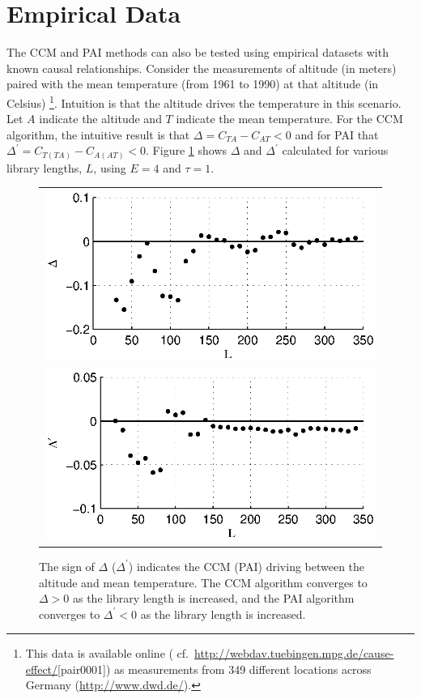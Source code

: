 \documentclass[twocolumn,aps,pre,groupedaddress]{revtex4-1}
\begin{document}
\section{Empirical Data}
The CCM and PAI methods can also be tested using empirical datasets with known causal relationships.  Consider the measurements of altitude (in meters) paired with the mean temperature (from 1961 to 1990) at that altitude (in Celsius) \footnote{This data is available online (\cite{bache2013} cf.\ \protect\url{http://webdav.tuebingen.mpg.de/cause-effect/}[pair0001]) as measurements from 349 different locations across Germany (\protect\url{http://www.dwd.de/}).}.  Intuition is that the altitude drives the temperature in this scenario.  Let $A$ indicate the altitude and $T$ indicate the mean temperature.  For the CCM algorithm, the intuitive result is that $\Delta = C_{TA}-C_{AT} < 0$ and for PAI that $\Delta^\prime = C_{T(TA)}-C_{A(AT)} < 0$.  Figure \ref{fig:alttempdata} shows $\Delta$ and $\Delta^\prime$ calculated for various library lengths, $L$, using $E=4$ and $\tau=1$.  
\begin{figure}[ht]
\begin{tabular}{l}
\includegraphics[scale=0.8]{alttempdataCCM.eps} \\
\includegraphics[scale=0.8]{alttempdataPAI.eps} \\
\end{tabular}
\caption{The sign of $\Delta$ ($\Delta^\prime$) indicates the CCM (PAI) driving between the altitude and mean temperature. The CCM algorithm converges to $\Delta>0$ as the library length is increased, and the PAI algorithm converges to $\Delta^\prime<0$ as the library length is increased.}
\label{fig:alttempdata}
\end{figure}
\end{document}
